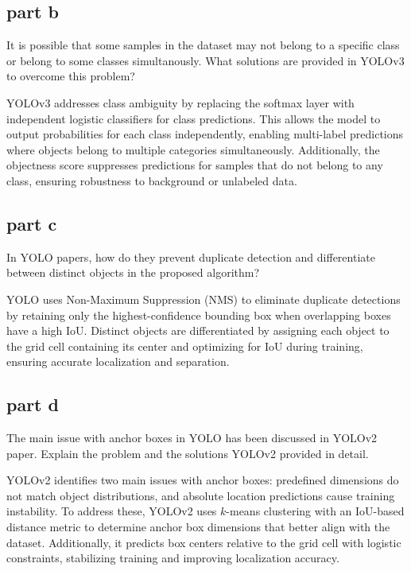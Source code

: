 \subsection{part b}
It is possible that some samples in the dataset may not belong to a specific class or belong to some classes simultanously. What solutions are provided in YOLOv3 to overcome this problem?
    \begin{qsolve}
      \begin{qsolve}[]
        YOLOv3 addresses class ambiguity by replacing the softmax layer with independent logistic classifiers for class predictions. This allows the model to output probabilities for each class independently, enabling multi-label predictions where objects belong to multiple categories simultaneously. Additionally, the objectness score suppresses predictions for samples that do not belong to any class, ensuring robustness to background or unlabeled data.

      \end{qsolve}
    \end{qsolve}
\subsection{part c}
In YOLO papers, how do they prevent duplicate detection and differentiate between distinct objects in the proposed algorithm?
    \begin{qsolve}
      \begin{qsolve}[]
        YOLO uses Non-Maximum Suppression (NMS) to eliminate duplicate detections by retaining only the highest-confidence bounding box when overlapping boxes have a high IoU. Distinct objects are differentiated by assigning each object to the grid cell containing its center and optimizing for IoU during training, ensuring accurate localization and separation.
      \end{qsolve}
        
    \end{qsolve}
\subsection{part d}
The main issue with anchor boxes in YOLO has been discussed in YOLOv2 paper. Explain the problem and the solutions YOLOv2 provided in detail.
    \begin{qsolve}
      \begin{qsolve}[]
        YOLOv2 identifies two main issues with anchor boxes: predefined dimensions do not match object distributions, and absolute location predictions cause training instability. To address these, YOLOv2 uses \(k\)-means clustering with an IoU-based distance metric to determine anchor box dimensions that better align with the dataset. Additionally, it predicts box centers relative to the grid cell with logistic constraints, stabilizing training and improving localization accuracy.
      \end{qsolve}
    \end{qsolve}
